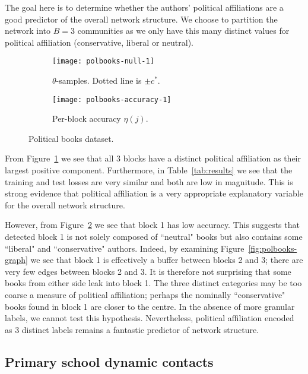 The goal here is to 
determine whether the authors' political affiliations are a good predictor 
of the overall network structure. We choose to partition the network into $B=3$ communities as we only have this many distinct values for political affiliation (conservative, liberal or neutral).
%
\begin{figure}[!h]
	\centering
	\begin{subfigure}[t]{0.45\linewidth}
		\centering
		\vskip 0pt
		\texttt{[image: polbooks-null-1]}
		\caption{$\theta$-samples. Dotted line is $\pm c^*$.}
		\label{fig:polbooks-null}
	\end{subfigure}
	\begin{subfigure}[t]{0.45\linewidth}
		\centering
		\vskip 0pt
		\texttt{[image: polbooks-accuracy-1]}
		\caption{Per-block accuracy $\eta(j)$.}
		\label{fig:polbooks-accuracy}
	\end{subfigure}
	\caption{Political books dataset.}
	\label{fig:polbooks}
\end{figure}

From Figure~\ref{fig:polbooks-null} we see that all 3 blocks have a distinct political affiliation as their largest positive component.  
Furthermore, in Table~\ref{tab:results} we see that the training and test losses 
are very similar and both are low in magnitude. This is strong evidence 
that political affiliation is a very appropriate explanatory 
variable for the overall network structure.

However, from Figure~\ref{fig:polbooks-accuracy} we see that block 1 has low accuracy. 
This suggests that detected block 1 is not solely composed of ``neutral" books but also 
contains some ``liberal" and ``conservative" authors. Indeed, by examining 
Figure~\ref{fig:polbooks-graph} we see that block 1 is effectively a buffer between 
blocks 2 and 3; there are very few edges between blocks 2 and 3. It is therefore not 
surprising that some books from either side leak into block 1.
The three distinct categories may be 
too coarse a measure of political affiliation; perhaps the nominally 
``conservative" books found in block 1 are closer to the centre. 
In the absence of more granular labels, we cannot test this hypothesis. 
Nevertheless, political affiliation encoded as 3 distinct labels 
remains a fantastic predictor of network structure.

\subsection{Primary school dynamic contacts}

